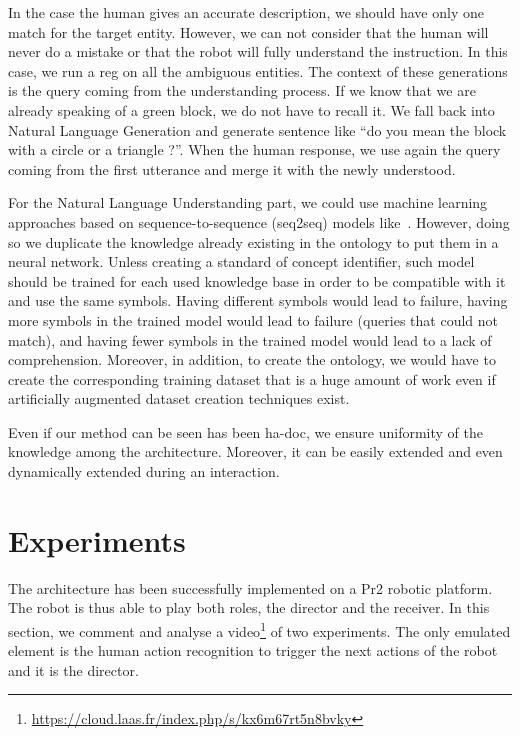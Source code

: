 In the case the human gives an accurate description, we should have only one match for the target entity. However, we can not consider that the human will never do a mistake or that the robot will fully understand the instruction. In this case, we run a \acrshort{reg} on all the ambiguous entities. The context of these generations is the \sparql{} query coming from the understanding process. If we know that we are already speaking of a green block, we do not have to recall it. We fall back into Natural Language Generation and generate sentence like ``do you mean the block with a circle or a triangle ?''. When the human response, we use again the \sparql{} query coming from the first utterance and merge it with the newly understood.

For the Natural Language Understanding part, we could use machine learning approaches based on sequence-to-sequence (seq2seq) models like~\cite{panchbhai_2020_exploring}. However, doing so we duplicate the knowledge already existing in the ontology to put them in a neural network. Unless creating a standard of concept identifier, such model should be trained for each used knowledge base in order to be compatible with it and use the same symbols. Having different symbols would lead to failure, having more symbols in the trained model would lead to failure (queries that could not match), and having fewer symbols in the trained model would lead to a lack of comprehension. Moreover, in addition, to create the ontology, we would have to create the corresponding training dataset that is a huge amount of work even if artificially augmented dataset creation techniques exist.

Even if our method can be seen has been ha-doc, we ensure uniformity of the knowledge among the architecture. Moreover, it can be easily extended and even dynamically extended during an interaction.

\section{Experiments}

The architecture has been successfully implemented on a Pr2 robotic platform. The robot is thus able to play both roles, the director and the receiver. In this section, we comment and analyse a video\footnote{\url{https://cloud.laas.fr/index.php/s/kx6m67rt5n8bvky}} of two experiments. The only emulated element is the human action recognition to trigger the next actions of the robot and it is the director.

